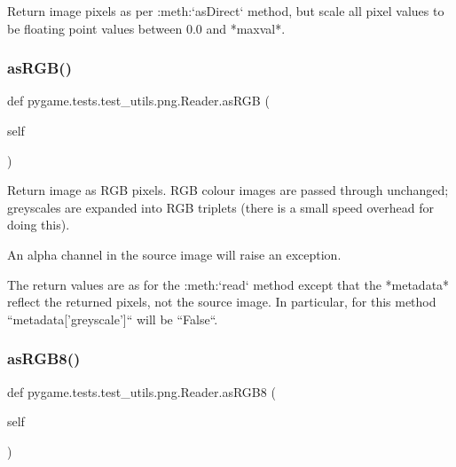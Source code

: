 \begin{DoxyVerb}Return image pixels as per :meth:`asDirect` method, but scale
all pixel values to be floating point values between 0.0 and
*maxval*.
\end{DoxyVerb}
 \mbox{\label{classpygame_1_1tests_1_1test__utils_1_1png_1_1_reader_ad4b892e5f71b9d1e521fb9495de0a662}} 
\subsubsection{\texorpdfstring{as\+R\+G\+B()}{asRGB()}}
{\footnotesize\ttfamily def pygame.\+tests.\+test\+\_\+utils.\+png.\+Reader.\+as\+R\+GB (\begin{DoxyParamCaption}\item[{}]{self }\end{DoxyParamCaption})}

\begin{DoxyVerb}Return image as RGB pixels.  RGB colour images are passed
through unchanged; greyscales are expanded into RGB
triplets (there is a small speed overhead for doing this).

An alpha channel in the source image will raise an
exception.

The return values are as for the :meth:`read` method
except that the *metadata* reflect the returned pixels, not the
source image.  In particular, for this method
``metadata['greyscale']`` will be ``False``.
\end{DoxyVerb}
 \mbox{\label{classpygame_1_1tests_1_1test__utils_1_1png_1_1_reader_ac8dc637d64d609068e754a883d4a6543}} 
\subsubsection{\texorpdfstring{as\+R\+G\+B8()}{asRGB8()}}
{\footnotesize\ttfamily def pygame.\+tests.\+test\+\_\+utils.\+png.\+Reader.\+as\+R\+G\+B8 (\begin{DoxyParamCaption}\item[{}]{self }\end{DoxyParamCaption})}

